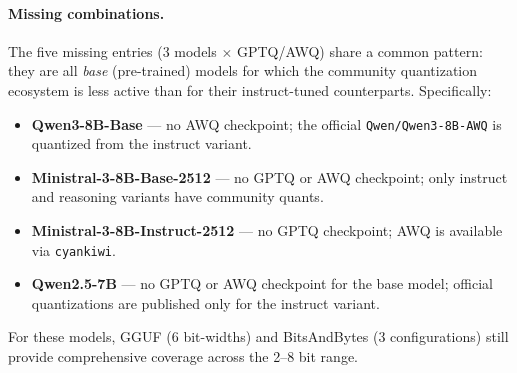 \paragraph{Missing combinations.}
The five missing entries (3 models $\times$ GPTQ/AWQ) share a common pattern: they are all \emph{base} (pre-trained) models for which the community quantization ecosystem is less active than for their instruct-tuned counterparts.
Specifically:
\begin{itemize}[nosep]
    \item \textbf{Qwen3-8B-Base} --- no AWQ checkpoint; the official \texttt{Qwen/Qwen3-8B-AWQ} is quantized from the instruct variant.
    \item \textbf{Ministral-3-8B-Base-2512} --- no GPTQ or AWQ checkpoint; only instruct and reasoning variants have community quants.
    \item \textbf{Ministral-3-8B-Instruct-2512} --- no GPTQ checkpoint; AWQ is available via \texttt{cyankiwi}.
    \item \textbf{Qwen2.5-7B} --- no GPTQ or AWQ checkpoint for the base model; official quantizations are published only for the instruct variant.
\end{itemize}
For these models, GGUF (6 bit-widths) and BitsAndBytes (3 configurations) still provide comprehensive coverage across the 2--8 bit range.

